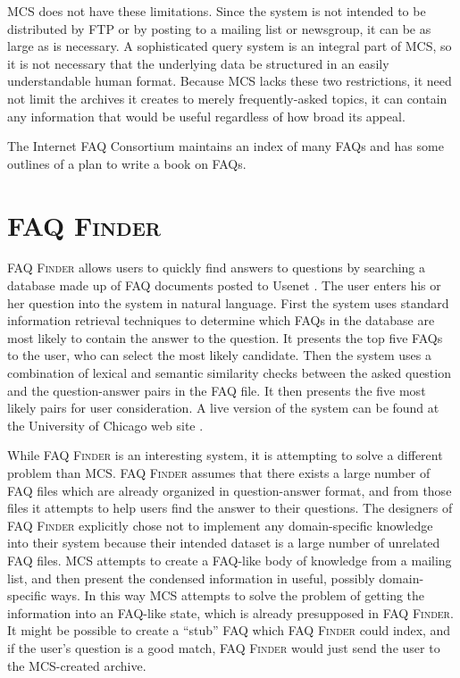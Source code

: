 MCS does not have these limitations. Since the system is not intended to be
distributed by FTP or by posting to a mailing list or newsgroup, it can be as
large as is necessary. A sophisticated query system is an integral part of MCS,
so it is not necessary that the underlying data be structured in an easily
understandable human format. Because MCS lacks these two restrictions, it need
not limit the archives it creates to merely frequently-asked topics, it can
contain any information that would be useful regardless of how broad its
appeal.

The Internet FAQ Consortium \cite{faqs.org} maintains an index of many FAQs and
has some outlines of a plan to write a book on FAQs.

\section{FAQ {\scshape Finder}}
FAQ {\scshape Finder} allows users to quickly find answers to questions by
searching a database made up of FAQ documents posted to Usenet \cite{Burke97}.
The user enters his or her question into the system in natural language. First
the system uses standard information retrieval techniques to determine which
FAQs in the database are most likely to contain the answer to the question. It
presents the top five FAQs to the user, who can select the most likely
candidate.  Then the system uses a combination of lexical and semantic
similarity checks between the asked question and the question-answer pairs in
the FAQ file. It then presents the five most likely pairs for user
consideration.  A live version of the system can be found at the University of
Chicago web site \cite{faq-finder-website}.

While FAQ {\scshape Finder} is an interesting system, it is attempting to solve
a different problem than MCS. FAQ {\scshape Finder} assumes that there exists a
large number of FAQ files which are already organized in question-answer
format, and from those files it attempts to help users find the answer to their
questions.  The designers of FAQ {\scshape Finder} explicitly chose not to
implement any domain-specific knowledge into their system because their
intended dataset is a large number of unrelated FAQ files. MCS attempts to
create a FAQ-like body of knowledge from a mailing list, and then present the
condensed information in useful, possibly domain-specific ways. In this way MCS
attempts to solve the problem of getting the information into an FAQ-like
state, which is already presupposed in FAQ {\scshape Finder}. It might be
possible to create a ``stub'' FAQ which FAQ {\scshape Finder} could index, and
if the user's question is a good match, FAQ {\scshape Finder} would just send
the user to the MCS-created archive.

